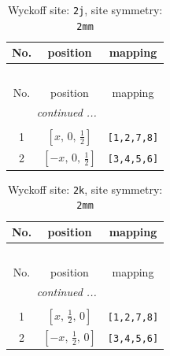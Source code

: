 \documentclass[fleqn,8pt]{jsarticle}
\begin{document}
\renewcommand{\arraystretch}{1.2}
\begin{longtable}{ccc}
\caption{Wyckoff site: {\tt 2j}, site symmetry: {\tt 2mm}}
 \\
 \hline \hline
No. & position & mapping \\ \hline \endfirsthead

\multicolumn{2}{l}{\tablename\ \thetable{}} \\
 \hline \hline
No. & position & mapping \\ \hline \endhead

 \hline \hline
\multicolumn{2}{r}{\footnotesize\it continued ...} \\ \endfoot

 \hline \hline
\multicolumn{2}{r}{} \\ \endlastfoot

1 & $\left[ x,\, 0,\, \frac{1}{2} \right]$ & {\tt [1,2,7,8]} \\ \hline
2 & $\left[ - x,\, 0,\, \frac{1}{2} \right]$ & {\tt [3,4,5,6]} \\
\end{longtable}
\renewcommand{\arraystretch}{1.2}
\begin{longtable}{ccc}
\caption{Wyckoff site: {\tt 2k}, site symmetry: {\tt 2mm}}
 \\
 \hline \hline
No. & position & mapping \\ \hline \endfirsthead

\multicolumn{2}{l}{\tablename\ \thetable{}} \\
 \hline \hline
No. & position & mapping \\ \hline \endhead

 \hline \hline
\multicolumn{2}{r}{\footnotesize\it continued ...} \\ \endfoot

 \hline \hline
\multicolumn{2}{r}{} \\ \endlastfoot

1 & $\left[ x,\, \frac{1}{2},\, 0 \right]$ & {\tt [1,2,7,8]} \\ \hline
2 & $\left[ - x,\, \frac{1}{2},\, 0 \right]$ & {\tt [3,4,5,6]} \\
\end{longtable}
\renewcommand{\arraystretch}{1.2}
\end{document}
